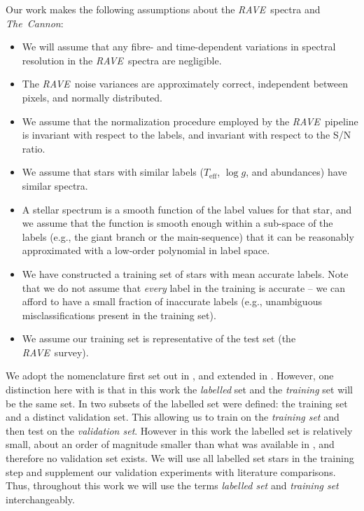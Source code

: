 \documentclass[preprint,trackchanges]{aastex}
\newcommand{\acronym}[1]{{\small{#1}}}
\newcommand{\project}[1]{\textsl{#1}}
\newcommand{\thecannon}{\project{The~Cannon}}
\newcommand{\rave}{\project{\acronym{RAVE}}}
\newcommand{\teff}{T_{\mathrm{eff}}}
\newcommand{\logg}{\log g}
\begin{document}
\noindent{}Our work makes the following assumptions about the \rave\ spectra and \thecannon:

\begin{itemize}
\item We will assume that any fibre- and time-dependent variations in spectral
resolution in the \rave\ spectra are negligible.
\item The \rave\ noise variances are approximately correct, independent between
pixels, and normally distributed.
\item We assume that the normalization procedure employed by the \rave\ pipeline
is invariant with respect to the labels, and invariant with respect to the S/N
ratio.
\item We assume that stars with similar labels ($\teff$, $\logg$, and abundances)
have similar spectra.
\item A stellar spectrum is a smooth function of the label values for that star,
and we assume that the function is smooth enough within a sub-space of the labels
(e.g., the giant branch or the main-sequence) that it can be reasonably approximated 
with a low-order polynomial in label space.
\item We have constructed a training set of stars with mean accurate labels.  Note
that we do not assume that \emph{every} label in the training is accurate -- we can
afford to have a small fraction of inaccurate labels (e.g., unambiguous misclassifications
present in the training set).
\item We assume our training set is representative of the test set (the \rave\ survey).
\end{itemize}


We adopt the nomenclature first set out in \citet{Ness_2015}, and extended in 
\citet{Casey_2016b}.  However, one distinction here with \citet{Casey_2016b} is 
that in this work the \emph{labelled} set and the \emph{training} set will be 
the same set.  In \citet{Casey_2016b} two subsets of the labelled set were 
defined: the training set and a distinct validation set.  This allowing us to 
train on the \emph{training set} and then test on the \emph{validation set}.  
However in this work the labelled set is relatively small, about an order of 
magnitude smaller than what was available in \citet{Casey_2016b}, and therefore 
no validation set exists. We will use all labelled set stars in the training 
step and supplement our validation experiments with literature comparisons.  
Thus, throughout this work we will use the terms \emph{labelled set} and 
\emph{training set} interchangeably. 
\end{document}

